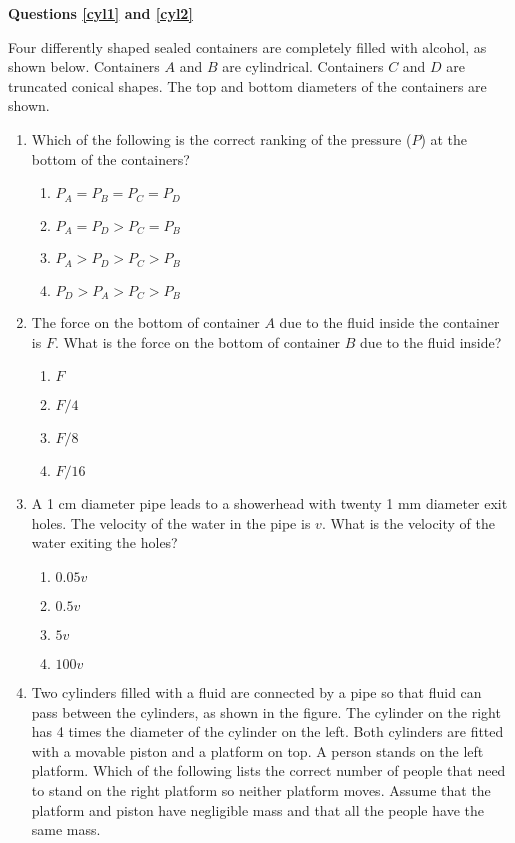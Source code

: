 \documentclass{../../../oss-apphys}
\begin{document}
\begin{multicols}{2}
  \textbf{Questions \ref{cyl1} and \ref{cyl2}}

  Four differently shaped sealed containers are completely filled with alcohol,
  as shown below. Containers $A$ and $B$ are cylindrical. Containers $C$ and
  $D$ are truncated conical shapes. The top and bottom diameters of the
  containers are shown.
  \begin{enumerate}[leftmargin=18pt,start=3]
    
  \item Which of the following is the correct ranking of the pressure ($P$) at
    the bottom of the containers?
    \label{cyl1}
    \begin{enumerate}[noitemsep,topsep=0pt,leftmargin=18pt,label=(\Alph*)]
    \item $P_A = P_B = P_C = P_D$
    \item $P_A = P_D > P_C = P_B$
    \item $P_A > P_D > P_C > P_B$
    \item $P_D > P_A > P_C > P_B$
    \end{enumerate}

  \item The force on the bottom of container $A$ due to the fluid inside the
    container is $F$. What is the force on the bottom of container $B$ due to
    the fluid inside?
    \label{cyl2}
    \begin{enumerate}[noitemsep,topsep=0pt,leftmargin=18pt,label=(\Alph*)]
    \item $F$
    \item $F/4$
    \item $F/8$
    \item $F/16$
    \end{enumerate}

  \item A 1 cm diameter pipe leads to a showerhead with twenty 1 mm diameter
    exit holes. The velocity of the water in the pipe is $v$. What is the
    velocity of the water exiting the holes?
    \begin{enumerate}[noitemsep,topsep=0pt,leftmargin=18pt,label=(\Alph*)]
    \item $0.05v$
    \item $0.5v$
    \item $5v$
    \item $100v$
    \end{enumerate}
    \columnbreak
    
  \item Two cylinders filled with a fluid are connected by a pipe so that fluid
    can pass between the cylinders, as shown in the figure. The cylinder
    on the right has 4 times the diameter of the cylinder on the left. Both
    cylinders are fitted with a movable piston and a platform on top. A
    person stands on the left platform. Which of the following lists the
    correct number of people that need to stand on the right platform so
    neither platform moves. Assume that the platform and piston have
    negligible mass and that all the people have the same mass.


\end{enumerate}
\end{multicols}
\end{document}
